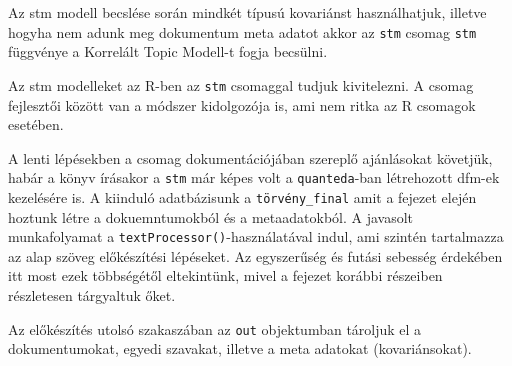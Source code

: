 \documentclass[
]{book}
\newenvironment{Shaded}{\begin{snugshade}}{\end{snugshade}}
\newcommand{\AttributeTok}[1]{\textcolor[rgb]{0.77,0.63,0.00}{#1}}
\newcommand{\ConstantTok}[1]{\textcolor[rgb]{0.00,0.00,0.00}{#1}}
\newcommand{\FunctionTok}[1]{\textcolor[rgb]{0.00,0.00,0.00}{#1}}
\newcommand{\NormalTok}[1]{#1}
\newcommand{\OtherTok}[1]{\textcolor[rgb]{0.56,0.35,0.01}{#1}}
\newcommand{\SpecialCharTok}[1]{\textcolor[rgb]{0.00,0.00,0.00}{#1}}
\newcommand{\StringTok}[1]{\textcolor[rgb]{0.31,0.60,0.02}{#1}}
\begin{document}
Az stm modell becslése során mindkét típusú kovariánst használhatjuk,
illetve hogyha nem adunk meg dokumentum meta adatot akkor az
\texttt{stm} csomag \texttt{stm} függvénye a Korrelált Topic Modell-t
fogja becsülni.

Az stm modelleket az R-ben az \texttt{stm} csomaggal tudjuk kivitelezni.
A csomag fejlesztői között van a módszer kidolgozója is, ami nem ritka
az R csomagok esetében.

A lenti lépésekben a csomag dokumentációjában szereplő ajánlásokat
követjük, habár a könyv írásakor a \texttt{stm} már képes volt a
\texttt{quanteda}-ban létrehozott dfm-ek kezelésére is. A kiinduló
adatbázisunk a \texttt{törvény\_final} amit a fejezet elején hoztunk
létre a dokuemntumokból és a metaadatokból. A javasolt munkafolyamat a
\texttt{textProcessor()}-használatával indul, ami szintén tartalmazza az
alap szöveg előkészítési lépéseket. Az egyszerűség és futási sebesség
érdekében itt most ezek többségétől eltekintünk, mivel a fejezet korábbi
részeiben részletesen tárgyaltuk őket.

Az előkészítés utolsó szakaszában az \texttt{out} objektumban tároljuk
el a dokumentumokat, egyedi szavakat, illetve a meta adatokat
(kovariánsokat).

\begin{Shaded}
\end{Shaded}
\end{document}
